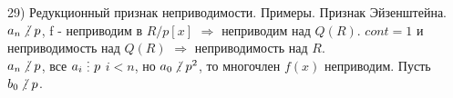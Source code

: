 29) Редукционный признак неприводимости. Примеры. Признак Эйзенштейна.\\

$a_n \ndi p$, f - неприводим в $R/p[x]$ $\Rightarrow$ неприводим над $Q(R)$. $cont = 1$ и неприводимость над $Q(R)$ $\Rightarrow$ неприводимость над $R$. \\ 
$a_n \ndi p$, все $a_i \di p$ $i<n$, но $a_0\ndi p^2$, то многочлен $f(x)$ неприводим. Пусть $b_0 \ndi p$.\\

